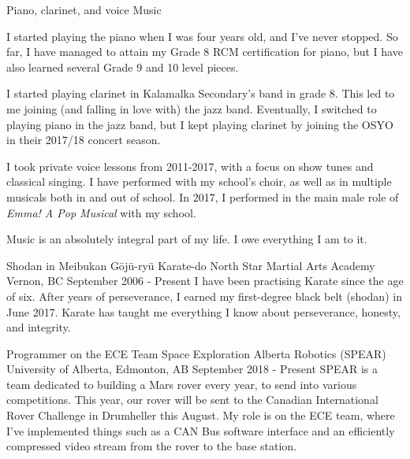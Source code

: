 

\begin{cventries}

  \cventry
    {Piano, clarinet, and voice} %
    {Music} %
    {} %
    {} %
    {
      \begin{cvitems} %
        \item {I started playing the piano when I was four years old, and I've never stopped. So far, I have managed to attain my Grade 8 RCM certification for piano, but I have also learned several Grade 9 and 10 level pieces.}
        \item {I started playing clarinet in Kalamalka Secondary's band in grade 8. This led to me joining (and falling in love with) the jazz band. Eventually, I switched to playing piano in the jazz band, but I kept playing clarinet by joining the OSYO in their 2017/18 concert season.}
        \item {I took private voice lessons from 2011-2017, with a focus on show tunes and classical singing. I have performed with my school's choir, as well as in multiple musicals both in and out of school. In 2017, I performed in the main male role of \textit{Emma! A Pop Musical} with my school.}
        \item {Music is an absolutely integral part of my life. I owe everything I am to it.}
      \end{cvitems}
    }

  \cventry
    {Shodan in Meibukan Gōjū-ryū Karate-do}
    {North Star Martial Arts Academy}
    {Vernon, BC}
    {September 2006 - Present}
    {I have been practising Karate since the age of six. After years of perseverance, I earned my first-degree black belt (shodan) in June 2017. Karate has taught me everything I know about perseverance, honesty, and integrity.}

  \cventry
    {Programmer on the ECE Team}
    {Space Exploration Alberta Robotics (SPEAR)}
    {University of Alberta, Edmonton, AB}
    {September 2018 - Present}
    {SPEAR is a team dedicated to building a Mars rover every year, to send into various competitions. This year, our rover will be sent to the Canadian International Rover Challenge in Drumheller this August. My role is on the ECE team, where I've implemented things such as a CAN Bus software interface and an efficiently compressed video stream from the rover to the base station.}

\end{cventries}
